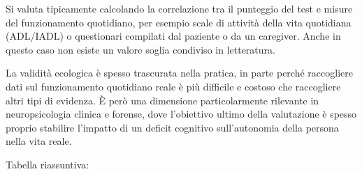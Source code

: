 \documentclass[
  italian,
  letterpaper,
  paper=6in:9in,
  pagesize=pdftex,
  headinclude=on,
  footinclude=on,
  11pt]{scrbook}
\begin{document}
Si valuta tipicamente calcolando la correlazione tra il punteggio del
test e misure del funzionamento quotidiano, per esempio scale di
attività della vita quotidiana (ADL/IADL) o questionari compilati dal
paziente o da un caregiver. Anche in questo caso non esiste un valore
soglia condiviso in letteratura.

La validità ecologica è spesso trascurata nella pratica, in parte perché
raccogliere dati sul funzionamento quotidiano reale è più difficile e
costoso che raccogliere altri tipi di evidenza. È però una dimensione
particolarmente rilevante in neuropsicologia clinica e forense, dove
l'obiettivo ultimo della valutazione è spesso proprio stabilire
l'impatto di un deficit cognitivo sull'autonomia della persona nella
vita reale.

Tabella riassuntiva:
\end{document}
